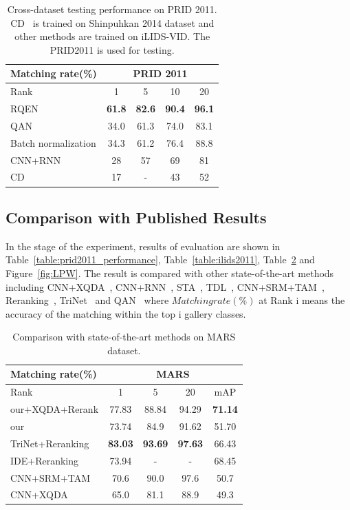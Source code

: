 \documentclass[letterpaper]{article} %
\begin{document}
\begin{table}[t]
\centering
\caption{Cross-dataset testing performance on PRID 2011. CD~\cite{hu2014cross} is trained on Shinpuhkan 2014 dataset and other methods are trained on iLIDS-VID. The PRID2011 is used for testing.}
{
\begin{tabular}{l|c|c|c|c}
\hline
Matching rate(\%)& \multicolumn{4}{c}{PRID 2011} \\
\hline
 Rank & 1 & 5 & 10 & 20 \\
\hline
RQEN & {\bf61.8} & {\bf82.6} & {\bf90.4} & {\bf96.1} \\
QAN &34.0 &61.3 & 74.0 &83.1 \\
Batch normalization & 34.3 & 61.2 & 76.4 & 88.8 \\
CNN+RNN& 28 & 57 & 69 & 81 \\
CD~\cite{hu2014cross} & 17 & - & 43 & 52 \\
\hline
\end{tabular}}

\label{table:crossp}
\end{table}

\subsection{Comparison with Published Results}
In the stage of the experiment, results of evaluation are shown in Table~\ref{table:prid2011_performance}, Table~\ref{table:ilids2011}, Table~\ref{table:mars_performance} and Figure~\ref{fig:LPW}. The result is compared with other state-of-the-art methods including CNN+XQDA~\cite{zheng2016mars}, CNN+RNN~\cite{mclaughlin2016recurrent}, STA~\cite{liu2015spatio}, TDL~\cite{you2016top}, CNN+SRM+TAM~\cite{tn2017see}, Reranking~\cite{Zhong_2017_CVPR}, TriNet~\cite{Li_2017_CVPR} and QAN~\cite{yu2017quality} where $Matching rate(\%)$ at Rank i means the accuracy of the matching within the top i gallery classes.

\begin{table}[t]
\centering
\caption{Comparison with state-of-the-art methods on MARS dataset.}
\begin{tabular}{l|c|c|c|c}
\hline
  Matching rate(\%)& \multicolumn{4}{c}{MARS} \\
  \hline
  Rank & 1 & 5& 20 & mAP\\
\hline
our+XQDA+Rerank & 77.83 & 88.84& 94.29 &{\bf71.14}\\
our &73.74 &84.9&91.62&51.70\\
\hline
TriNet+Reranking&{\bf83.03}&{\bf93.69}&{\bf97.63}&66.43\\
IDE+Reranking &73.94&-&-&68.45\\
CNN+SRM+TAM &70.6 &90.0&97.6&50.7\\
CNN+XQDA & 65.0 & 81.1 & 88.9 &49.3 \\
\hline
\end{tabular}
\label{table:mars_performance}
\end{table}
\end{document}
